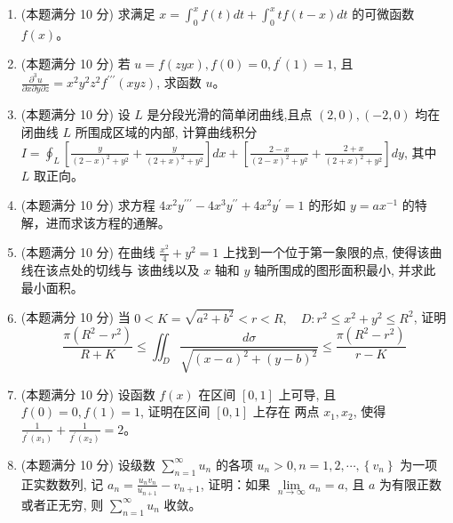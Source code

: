 \begin{enumerate}
\item 
(本题满分 10 分)
求满足 $x=\int_{0}^{x} f(t) d t+\int_{0}^{x} t f(t-x) d t$ 的可微函数 $f(x)$。




\item 
(本题满分 10 分)
若 $u=f(z y x), f(0)=0, f^{\prime}(1)=1$, 且 $\frac{\partial^{3} u}{\partial x \partial y \partial z}=x^{2} y^{2} z^{2} f^{\prime \prime \prime}(x y z)$, 求函数 $u$。



\item 
(本题满分 10 分)
设 $L$ 是分段光滑的简单闭曲线,且点 $(2,0),(-2,0)$ 均在闭曲线 $L$ 所围成区域的内部, 计算曲线积分 $I=\oint_{L}\left[\frac{y}{(2-x)^{2}+y^{2}}+\frac{y}{(2+x)^{2}+y^{2}}\right] d x+\left[\frac{2-x}{(2-x)^{2}+y^{2}}+\frac{2+x}{(2+x)^{2}+y^{2}}\right] d y$, 其中 $L$ 取正向。




\item 
(本题满分 10 分)
求方程 $4 x^{2} y^{\prime \prime \prime}-4 x^{3} y^{\prime \prime}+4 x^{2} y^{\prime}=1$ 的形如 $y=a x^{-1}$ 的特解，进而求该方程的通解。



\newpage
\item 
(本题满分 10 分)
在曲线 $\frac{x^{2}}{4}+y^{2}=1$ 上找到一个位于第一象限的点, 使得该曲线在该点处的切线与 该曲线以及 $x$ 轴和 $y$ 轴所围成的图形面积最小, 并求此最小面积。






\item 
(本题满分 10 分)
当 $0<K=\sqrt{a^{2}+b^{2}}<r<R, \quad D: r^{2} \leqslant x^{2}+y^{2} \leqslant R^{2}$, 证明
\[
\frac{\pi\left(R^{2}-r^{2}\right)}{R+K} \leqslant \iint_{D} \frac{d \sigma}{\sqrt{(x-a)^{2}+(y-b)^{2}}} \leqslant \frac{\pi\left(R^{2}-r^{2}\right)}{r-K}
\]




\item 
(本题满分 10 分)
设函数 $f(x)$ 在区间 $[0,1]$ 上可导, 且 $f(0)=0, f(1)=1$, 证明在区间 $[0,1]$ 上存在 两点 $x_{1}, x_{2}$, 使得 $\frac{1}{f^{\prime}\left(x_{1}\right)}+\frac{1}{f^{\prime}\left(x_{2}\right)}=2$。




\item 
(本题满分 10 分)
设级数 $\sum\limits_{n=1}^{\infty} u_{n}$ 的各项 $u_{n}>0, n=1,2, \cdots,\left\{v_{n}\right\}$ 为一项正实数数列, 记 $a_{n}=\frac{u_{n} v_{n}}{u_{n+1}}-v_{n+1}$, 证明：如果 $\lim\limits _{n \rightarrow \infty} a_{n}=a$, 且 $a$ 为有限正数或者正无穷, 则 $\sum\limits_{n=1}^{\infty} u_{n}$ 收敛。



	
	
	
\end{enumerate}



